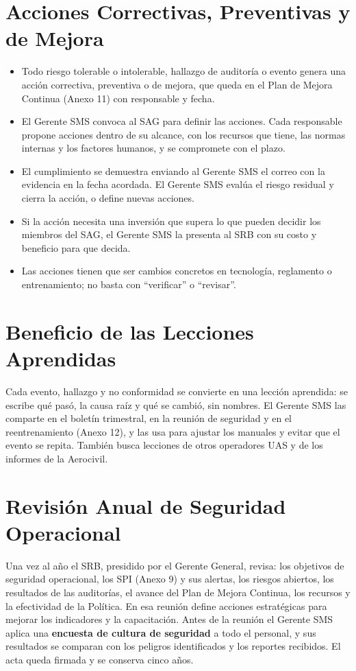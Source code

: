 \section{Acciones Correctivas, Preventivas y de Mejora}
\begin{itemize}
    \item Todo riesgo tolerable o intolerable, hallazgo de auditoría o evento genera una acción correctiva, preventiva o de mejora, que queda en el Plan de Mejora Continua (Anexo 11) con responsable y fecha.
    \item El Gerente SMS convoca al SAG para definir las acciones. Cada responsable propone acciones dentro de su alcance, con los recursos que tiene, las normas internas y los factores humanos, y se compromete con el plazo.
    \item El cumplimiento se demuestra enviando al Gerente SMS el correo con la evidencia en la fecha acordada. El Gerente SMS evalúa el riesgo residual y cierra la acción, o define nuevas acciones.
    \item Si la acción necesita una inversión que supera lo que pueden decidir los miembros del SAG, el Gerente SMS la presenta al SRB con su costo y beneficio para que decida.
    \item Las acciones tienen que ser cambios concretos en tecnología, reglamento o entrenamiento; no basta con ``verificar'' o ``revisar''.
\end{itemize}

\section{Beneficio de las Lecciones Aprendidas}
Cada evento, hallazgo y no conformidad se convierte en una lección aprendida: se escribe qué pasó, la causa raíz y qué se cambió, sin nombres. El Gerente SMS las comparte en el boletín trimestral, en la reunión de seguridad y en el reentrenamiento (Anexo 12), y las usa para ajustar los manuales y evitar que el evento se repita. También busca lecciones de otros operadores UAS y de los informes de la Aerocivil.

\section{Revisión Anual de Seguridad Operacional}
Una vez al año el SRB, presidido por el Gerente General, revisa: los objetivos de seguridad operacional, los SPI (Anexo 9) y sus alertas, los riesgos abiertos, los resultados de las auditorías, el avance del Plan de Mejora Continua, los recursos y la efectividad de la Política. En esa reunión define acciones estratégicas para mejorar los indicadores y la capacitación. Antes de la reunión el Gerente SMS aplica una \textbf{encuesta de cultura de seguridad} a todo el personal, y sus resultados se comparan con los peligros identificados y los reportes recibidos. El acta queda firmada y se conserva cinco años.
